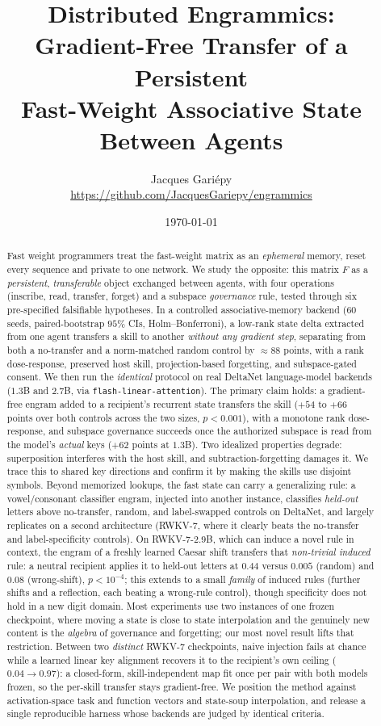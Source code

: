 \documentclass[11pt]{article}
\title{\textbf{Distributed Engrammics:\\ Gradient-Free Transfer of a Persistent\\ Fast-Weight Associative State Between Agents}}
\author{Jacques Gari\'epy\\[2pt]\small \url{https://github.com/JacquesGariepy/engrammics}}
\date{\today}
\theoremstyle{definition}
\newcommand{\F}{F}
\begin{document}
\maketitle

\begin{abstract}
\noindent
Fast weight programmers treat the fast-weight matrix as an \emph{ephemeral} memory, reset every sequence and private to one network. We study the opposite: this matrix $\F$ as a \emph{persistent}, \emph{transferable} object exchanged between agents, with four operations (inscribe, read, transfer, forget) and a subspace \emph{governance} rule, tested through six pre-specified falsifiable hypotheses. In a controlled associative-memory backend ($60$ seeds, paired-bootstrap $95\%$ CIs, Holm--Bonferroni), a low-rank state delta extracted from one agent transfers a skill to another \emph{without any gradient step}, separating from both a no-transfer and a norm-matched random control by $\approx 88$ points, with a rank dose-response, preserved host skill, projection-based forgetting, and subspace-gated consent. We then run the \emph{identical} protocol on real DeltaNet language-model backends ($1.3$B and $2.7$B, via \texttt{flash-linear-attention}). The primary claim holds: a gradient-free engram added to a recipient's recurrent state transfers the skill ($+54$ to $+66$ points over both controls across the two sizes, $p<0.001$), with a monotone rank dose-response, and subspace governance succeeds once the authorized subspace is read from the model's \emph{actual} keys ($+62$ points at $1.3$B). Two idealized properties degrade: superposition interferes with the host skill, and subtraction-forgetting damages it. We trace this to shared key directions and confirm it by making the skills use disjoint symbols. Beyond memorized lookups, the fast state can carry a generalizing rule: a vowel/consonant classifier engram, injected into another instance, classifies \emph{held-out} letters above no-transfer, random, and label-swapped controls on DeltaNet, and largely replicates on a second architecture (RWKV-7, where it clearly beats the no-transfer and label-specificity controls). On RWKV-7-$2.9$B, which can induce a novel rule in context, the engram of a freshly learned Caesar shift transfers that \emph{non-trivial induced} rule: a neutral recipient applies it to held-out letters at $0.44$ versus $0.005$ (random) and $0.08$ (wrong-shift), $p<10^{-4}$; this extends to a small \emph{family} of induced rules (further shifts and a reflection, each beating a wrong-rule control), though specificity does not hold in a new digit domain. Most experiments use two instances of one frozen checkpoint, where moving a state is close to state interpolation and the genuinely new content is the \emph{algebra} of governance and forgetting; our most novel result lifts that restriction. Between two \emph{distinct} RWKV-7 checkpoints, naive injection fails at chance while a learned linear key alignment recovers it to the recipient's own ceiling ($0.04\to0.97$): a closed-form, skill-independent map fit once per pair with both models frozen, so the per-skill transfer stays gradient-free. We position the method against activation-space task and function vectors and state-soup interpolation, and release a single reproducible harness whose backends are judged by identical criteria.

\end{abstract}
\end{document}
